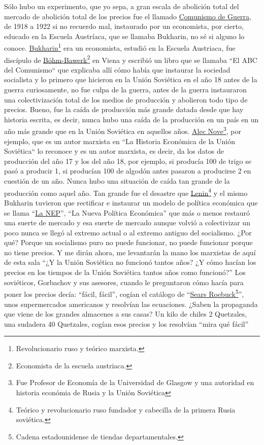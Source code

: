 Sólo hubo un experimento, que yo sepa, a gran escala de abolición total del mercado de abolición total de los precios fue el llamado \href{https://en.wikipedia.org/wiki/War_communism}{Comunismo de Guerra}, de 1918 a 1922 si no recuerdo mal, instaurado por un economista, por cierto, educado en la Escuela Austríaca, que se llamaba Bukharin, no sé si alguno lo conoce. \href{https://en.wikipedia.org/wiki/Nikolai_Bukharin}{Bukharin}\footnote{Revolucionario ruso y teórico marxista.} era un economista, estudió en la Escuela Austriaca, fue discípulo de \href{https://en.wikipedia.org/wiki/Eugen_von_B%C3%B6hm-Bawerk}{Böhm-Bawerk}\footnote{Economista de la escuela austriaca.} en Viena y escribió un libro que se llamaba ``El ABC del Comunismo``\cite{bukharin1920abc} que explicaba allí cómo había que instaurar la sociedad socialista y lo primero que hicieron en la Unión Soviética en el año 18 antes de la guerra curiosamente, no fue culpa de la guerra, antes de la guerra instauraron una colectivización total de los medios de producción y abolieron todo tipo de precios. Bueno, fue la caída de producción más grande datada desde que hay historia escrita, es decir, nunca hubo una caída de la producción en un país en un año más grande que en la Unión Soviética en aquellos años. \href{https://en.wikipedia.org/wiki/Alexander_Nove}{Alec Nove}\footnote{Fue Profesor de Economía de la Universidad de Glasgow y una autoridad en historia económia de Rusia y la Unión Soviética}, por ejemplo, que es un autor marxista en ``La Historia Económica de la Unión Soviética``\cite{nove1992economic} lo reconoce y es un autor marxista, es decir, da los datos de producción del año 17 y los del año 18, por ejemplo, si producía 100 de trigo se pasó a producir 1, si producían 100 de algodón antes pasaron a producirse 2 en cuestión de un año. Nunca hubo una situación de caída tan grande de la producción como aquel año. Tan grande fue el desastre que \href{https://en.wikipedia.org/wiki/Vladimir_Lenin}{Lenin}\footnote{Teórico y revolucionario ruso fundador y cabecilla de la primera Rusia soviética.} y el mismo Bukharin tuvieron que rectificar e instaurar un modelo de política económica que se llama \enquote{\href{https://en.wikipedia.org/wiki/New_Economic_Policy}{La NEP}}, \enquote{La Nueva Política Económica} que más o menos restauró una suerte de mercado y esa suerte de mercado aunque volvió a colectivizar un poco nunca se llegó al extremo actual o al extremo antiguo del socialismo. ¿Por qué? Porque un socialismo puro no puede funcionar, no puede funcionar porque no tiene precios. Y me dirán ahora, me levantarán la mano los marxistas de aquí de esta sala \enquote{¿Y la Unión Soviética no funcionó tantos años? ¿Y cómo hacían los precios en los tiempos de la Unión Soviética tantos años como funcionó?} Los soviéticos, Gorbachov y sus asesores, cuando le preguntaron cómo hacía para poner los precios decía: \enquote{fácil, fácil}, cogían el catálogo de \enquote{\href{https://en.wikipedia.org/wiki/Sears}{Sears Roebuck}\footnote{Cadena estadounidense de tiendas departamentales.}}, unos supermercados americanos y resolvían las ecuaciones. ¿Saben la propaganda que viene de los grandes almacenes a sus casas? Un kilo de chiles 2 Quetzales, una sudadera 40 Quetzales, cogían esos precios y los resolvían \enquote{mira qué fácil} 